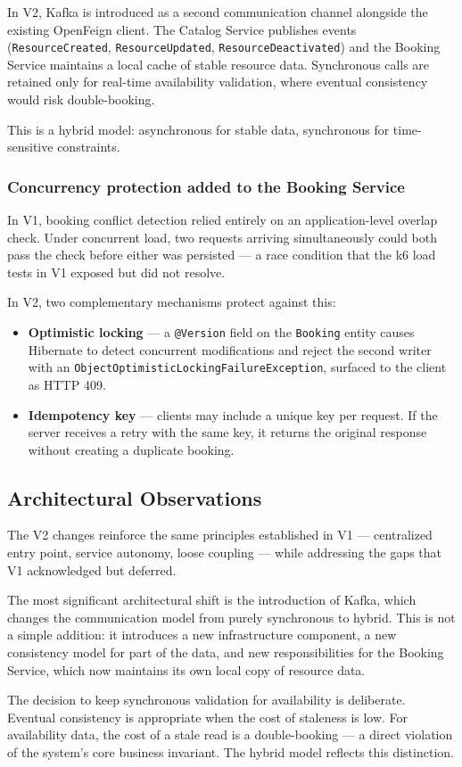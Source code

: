 In V2, Kafka is introduced as a second communication channel alongside the existing OpenFeign client. The Catalog Service publishes events (\texttt{ResourceCreated}, \texttt{ResourceUpdated}, \texttt{ResourceDeactivated}) and the Booking Service maintains a local cache of stable resource data. Synchronous calls are retained only for real-time availability validation, where eventual consistency would risk double-booking.

This is a hybrid model: asynchronous for stable data, synchronous for time-sensitive constraints.

\subsubsection{Concurrency protection added to the Booking Service}

In V1, booking conflict detection relied entirely on an application-level overlap check. Under concurrent load, two requests arriving simultaneously could both pass the check before either was persisted --- a race condition that the k6 load tests in V1 exposed but did not resolve.

In V2, two complementary mechanisms protect against this:

\begin{itemize}
    \item \textbf{Optimistic locking} --- a \texttt{@Version} field on the \texttt{Booking} entity causes Hibernate to detect concurrent modifications and reject the second writer with an \texttt{ObjectOptimisticLockingFailureException}, surfaced to the client as HTTP 409.
    \item \textbf{Idempotency key} --- clients may include a unique key per request. If the server receives a retry with the same key, it returns the original response without creating a duplicate booking.
\end{itemize}

\subsection{Architectural Observations}

The V2 changes reinforce the same principles established in V1 --- centralized entry point, service autonomy, loose coupling --- while addressing the gaps that V1 acknowledged but deferred.

The most significant architectural shift is the introduction of Kafka, which changes the communication model from purely synchronous to hybrid. This is not a simple addition: it introduces a new infrastructure component, a new consistency model for part of the data, and new responsibilities for the Booking Service, which now maintains its own local copy of resource data.

The decision to keep synchronous validation for availability is deliberate. Eventual consistency is appropriate when the cost of staleness is low. For availability data, the cost of a stale read is a double-booking --- a direct violation of the system's core business invariant. The hybrid model reflects this distinction.